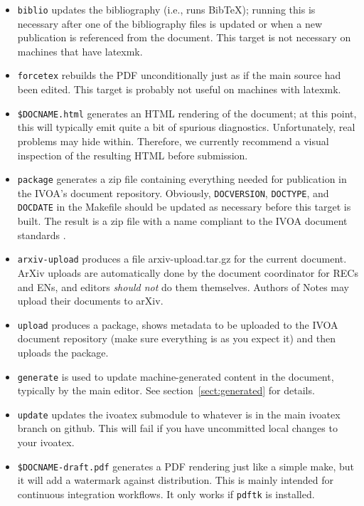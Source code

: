 \documentclass[11pt,a4paper]{ivoa}
\newcommand{\BibTeX}{BibTeX}
\begin{document}
\begin{itemize}
\item \texttt{biblio} updates the bibliography (i.e., runs \BibTeX);
running this is necessary after one of the bibliography files is updated
or when a new publication is referenced from the document.  This target
is not necessary on machines that have latexmk.
\item \texttt{forcetex} rebuilds the PDF unconditionally just as if the
main source had been edited.  This target is probably not useful on
machines with latexmk.
\item \texttt{\$DOCNAME.html} generates an HTML rendering of the
document; at this point, this will typically emit quite a bit of
spurious diagnostics.  Unfortunately, real problems may hide within.  
Therefore, we currently recommend a visual inspection of the resulting
HTML before submission.
\item \texttt{package} generates a zip file containing everything needed
for publication in the IVOA's document repository.   Obviously, 
\texttt{DOCVERSION}, \texttt{DOCTYPE}, and \texttt{DOCDATE} in the
Makefile should be updated as necessary before this target is built.
The result is a zip file with a name compliant to the IVOA document
standards \citep{2017ivoa.spec.0517G}.
\item \texttt{arxiv-upload}  produces a file arxiv-upload.tar.gz for
the current document.  ArXiv uploads are automatically done by the
document coordinator for RECs and ENs, and editors \emph{should not} do
them themselves.  Authors of Notes may upload their documents to arXiv.
\item \texttt{upload} produces a package, shows metadata to be uploaded to the
IVOA document repository (make sure everything is as you expect it) and
then uploads the package.
\item \texttt{generate} is used to update machine-generated content in
the document, typically by the main editor.  See
section~\ref{sect:generated} for details.
\item \texttt{update} updates the ivoatex submodule to whatever is in
the main ivoatex branch on github.  This will fail if you have
uncommitted local changes to your ivoatex.
\item \texttt{\$DOCNAME-draft.pdf} generates a PDF rendering just like a
simple make, but it will add a watermark against distribution.  This is
mainly intended for continuous integration workflows.  It only works
if \verb|pdftk| is installed.
\end{itemize}
\end{document}

